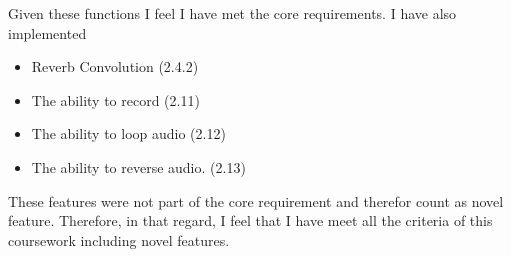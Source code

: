 \documentclass[12pt]{article}
\begin{document}
			Given these functions I feel I have met the core requirements. I have also implemented 
			
			\begin{itemize}
				\item Reverb Convolution (2.4.2)
				\item The ability to record (2.11)
				\item The ability to loop audio (2.12)
				\item The ability to reverse audio. (2.13)
			\end{itemize}	

				These features were not part of the core requirement and therefor count as novel feature. Therefore, in that regard, I feel that I have meet all the criteria of this coursework including novel features. 
\end{document}
